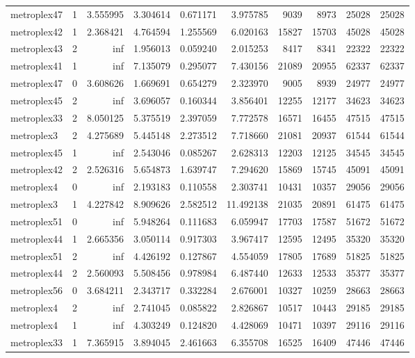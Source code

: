 \begin{longtable}{|l|r|r|r|r|r|r|r|r|r|}
metroplex47 & 1 & 3.555995 & 3.304614 & 0.671171 & 3.975785 & 9039 & 8973 & 25028 & 25028 \\
metroplex42 & 1 & 2.368421 & 4.764594 & 1.255569 & 6.020163 & 15827 & 15703 & 45028 & 45028 \\
metroplex43 & 2 & inf & 1.956013 & 0.059240 & 2.015253 & 8417 & 8341 & 22322 & 22322 \\
metroplex41 & 1 & inf & 7.135079 & 0.295077 & 7.430156 & 21089 & 20955 & 62337 & 62337 \\
metroplex47 & 0 & 3.608626 & 1.669691 & 0.654279 & 2.323970 & 9005 & 8939 & 24977 & 24977 \\
metroplex45 & 2 & inf & 3.696057 & 0.160344 & 3.856401 & 12255 & 12177 & 34623 & 34623 \\
metroplex33 & 2 & 8.050125 & 5.375519 & 2.397059 & 7.772578 & 16571 & 16455 & 47515 & 47515 \\
metroplex3 & 2 & 4.275689 & 5.445148 & 2.273512 & 7.718660 & 21081 & 20937 & 61544 & 61544 \\
metroplex45 & 1 & inf & 2.543046 & 0.085267 & 2.628313 & 12203 & 12125 & 34545 & 34545 \\
metroplex42 & 2 & 2.526316 & 5.654873 & 1.639747 & 7.294620 & 15869 & 15745 & 45091 & 45091 \\
metroplex4 & 0 & inf & 2.193183 & 0.110558 & 2.303741 & 10431 & 10357 & 29056 & 29056 \\
metroplex3 & 1 & 4.227842 & 8.909626 & 2.582512 & 11.492138 & 21035 & 20891 & 61475 & 61475 \\
metroplex51 & 0 & inf & 5.948264 & 0.111683 & 6.059947 & 17703 & 17587 & 51672 & 51672 \\
metroplex44 & 1 & 2.665356 & 3.050114 & 0.917303 & 3.967417 & 12595 & 12495 & 35320 & 35320 \\
metroplex51 & 2 & inf & 4.426192 & 0.127867 & 4.554059 & 17805 & 17689 & 51825 & 51825 \\
metroplex44 & 2 & 2.560093 & 5.508456 & 0.978984 & 6.487440 & 12633 & 12533 & 35377 & 35377 \\
metroplex56 & 0 & 3.684211 & 2.343717 & 0.332284 & 2.676001 & 10327 & 10259 & 28663 & 28663 \\
metroplex4 & 2 & inf & 2.741045 & 0.085822 & 2.826867 & 10517 & 10443 & 29185 & 29185 \\
metroplex4 & 1 & inf & 4.303249 & 0.124820 & 4.428069 & 10471 & 10397 & 29116 & 29116 \\
metroplex33 & 1 & 7.365915 & 3.894045 & 2.461663 & 6.355708 & 16525 & 16409 & 47446 & 47446 \\

\end{longtable}

